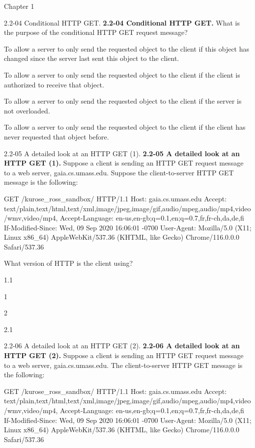\documentclass[a4paper]{article}
\begin{document}
\begin{quiz}{Chapter 1}
\begin{multi}[points=1,shuffle]{2.2-04 Conditional HTTP GET.}
\textbf{2.2-04 Conditional HTTP GET. } What is the purpose of the conditional HTTP GET request message?
\item* To allow a server to only send the requested object to the client if this object has changed since the server last sent this object to the client.
\item To allow a server to only send the requested object to the client if the client is authorized to receive that object.
\item To allow a server to only send the requested object to the client if the server is not overloaded.
\item To allow a server to only send the requested object to the client if the client has never requested that object before.
\end{multi}

\begin{multi}[points=1,shuffle]{2.2-05 A detailed look at an HTTP GET (1).}
\textbf{2.2-05 A detailed look at an HTTP GET (1).} 
Suppose a client is sending an HTTP GET request message to a web server, gaia.cs.umass.edu. Suppose the client-to-server HTTP GET message is the following:

GET /kurose_ross_sandbox/ HTTP/1.1
Host: gaia.cs.umass.edu
Accept: text/plain,text/html,text/xml,image/jpeg,image/gif,audio/mpeg,audio/mp4,video/wmv,video/mp4,
Accept-Language: en-us,en-gb;q=0.1,en;q=0.7,fr,fr-ch,da,de,fi
If-Modified-Since: Wed, 09 Sep 2020 16:06:01 -0700
User-Agent: Mozilla/5.0 (X11; Linux x86_64) AppleWebKit/537.36 (KHTML, like Gecko) Chrome/116.0.0.0 Safari/537.36

What version of HTTP is the client using?
\item* 1.1
\item 1
\item 2
\item 2.1
\end{multi}

\begin{multi}[points=1,shuffle]{2.2-06 A detailed look at an HTTP GET (2).}
\textbf{2.2-06 A detailed look at an HTTP GET (2).}
Suppose a client is sending an HTTP GET request message to a web server, gaia.cs.umass.edu.  The client-to-server HTTP GET message is the following: 

GET /kurose_ross_sandbox/ HTTP/1.1
Host: gaia.cs.umass.edu
Accept: text/plain,text/html,text/xml,image/jpeg,image/gif,audio/mpeg,audio/mp4,video/wmv,video/mp4,
Accept-Language: en-us,en-gb;q=0.1,en;q=0.7,fr,fr-ch,da,de,fi
If-Modified-Since: Wed, 09 Sep 2020 16:06:01 -0700
User-Agent: Mozilla/5.0 (X11; Linux x86_64) AppleWebKit/537.36 (KHTML, like Gecko) Chrome/116.0.0.0 Safari/537.36



\end{multi}
\end{quiz}
\end{document}
